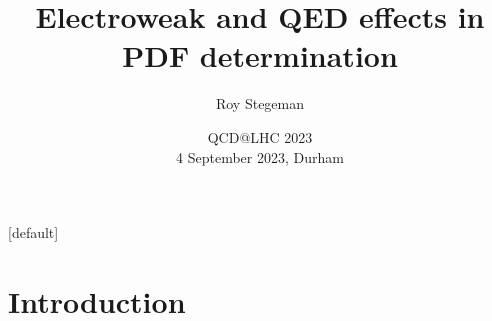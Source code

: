 \documentclass[aspectratio=169, 8pt,t]{beamer}
\title{Electroweak and QED effects in PDF determination}
\date{QCD@LHC 2023  \\[0.1cm] 4 September 2023, Durham}
\author{Roy Stegeman}
\institute{\small The University of Edinburgh}
\begin{document}
{
\begin{frame}
  \titlepage
\end{frame}
}

[default]












\section*{Introduction}
\end{document}
